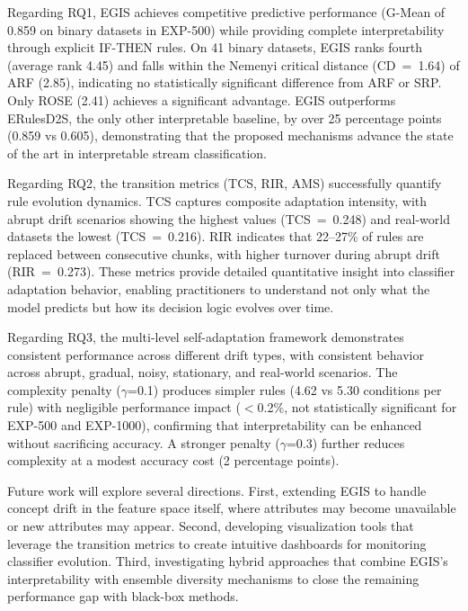 \documentclass[lettersize,journal]{IEEEtran}
\begin{document}
Regarding RQ1, EGIS achieves competitive predictive performance (G-Mean of 0.859 on binary datasets in EXP-500) while providing complete interpretability through explicit IF-THEN rules. On 41 binary datasets, EGIS ranks fourth (average rank 4.45) and falls within the Nemenyi critical distance (CD~=~1.64) of ARF (2.85), indicating no statistically significant difference from ARF or SRP. Only ROSE (2.41) achieves a significant advantage. EGIS outperforms ERulesD2S, the only other interpretable baseline, by over 25 percentage points (0.859 vs 0.605), demonstrating that the proposed mechanisms advance the state of the art in interpretable stream classification.

Regarding RQ2, the transition metrics (TCS, RIR, AMS) successfully quantify rule evolution dynamics. TCS captures composite adaptation intensity, with abrupt drift scenarios showing the highest values (TCS~=~0.248) and real-world datasets the lowest (TCS~=~0.216). RIR indicates that 22--27\% of rules are replaced between consecutive chunks, with higher turnover during abrupt drift (RIR~=~0.273). These metrics provide detailed quantitative insight into classifier adaptation behavior, enabling practitioners to understand not only what the model predicts but how its decision logic evolves over time.

Regarding RQ3, the multi-level self-adaptation framework demonstrates consistent performance across different drift types, with consistent behavior across abrupt, gradual, noisy, stationary, and real-world scenarios. The complexity penalty ($\gamma$=0.1) produces simpler rules (4.62 vs 5.30 conditions per rule) with negligible performance impact ($<$0.2\%, not statistically significant for EXP-500 and EXP-1000), confirming that interpretability can be enhanced without sacrificing accuracy. A stronger penalty ($\gamma$=0.3) further reduces complexity at a modest accuracy cost (2 percentage points).

Future work will explore several directions. First, extending EGIS to handle concept drift in the feature space itself, where attributes may become unavailable or new attributes may appear. Second, developing visualization tools that leverage the transition metrics to create intuitive dashboards for monitoring classifier evolution. Third, investigating hybrid approaches that combine EGIS's interpretability with ensemble diversity mechanisms to close the remaining performance gap with black-box methods.
\end{document}
